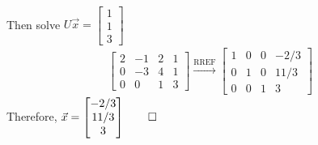 \documentclass[12pt, a4paper]{article}
\begin{document}
\begin{enumerate}[Q\arabic*.]
\begin{enumerate}[(\alph*)]
\begin{align*}
        \end{align*}
        Then solve $U \vec{x} = \begin{bmatrix}1\\1\\3\end{bmatrix}$
        \begin{align*}
          \begin{bmatrix}2&-1&2&1\\0&-3&4&1\\0&0&1&3\end{bmatrix} \xrightarrow{\text{RREF}}
          \begin{bmatrix}1&0&0&-2/3\\0&1&0&11/3\\0&0&1&3\end{bmatrix}
        \end{align*}
        Therefore, $\vec{x} = \begin{bmatrix}-2/3\\11/3\\3\end{bmatrix} \qed$



\end{enumerate}
\end{enumerate}
\end{document}
